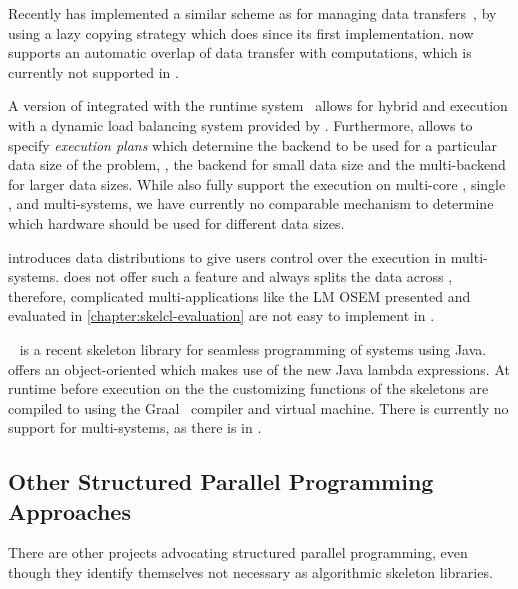Recently \SkePU has implemented a similar scheme as \SkelCL for managing data transfers~\cite{DastgeerKe14}, by using a lazy copying strategy which \SkelCL does since its first implementation.
\SkePU now supports an automatic overlap of data transfer with computations, which is currently not supported in \SkelCL.

A version of \SkePU integrated with the \StarPU runtime system~\cite{AugonnetTNW09} allows for hybrid \CPU and \GPU execution with a dynamic load balancing system provided by \StarPU.
Furthermore, \SkePU allows to specify \emph{execution plans} which determine the backend to be used for a particular data size of the problem, \eg, the \OpenMP backend for small data size and the \CUDA multi-\GPU backend for larger data sizes.
While \SkelCL also fully support the execution on multi-core \CPUs, single \GPUs, and  multi-\GPU systems, we have currently no comparable mechanism to determine which hardware should be used for different data sizes.

\SkelCL introduces data distributions to give users control over the execution in multi-\GPU systems.
\SkePU does not offer such a feature and always splits the data across \GPUs, therefore, complicated multi-\GPU applications like the LM OSEM presented and evaluated in \autoref{chapter:skelcl-evaluation} are not easy to implement in \SkePU.

\bigskip

\emph{\JPAI}~\cite{FumeroStDu2014} is a recent skeleton library for seamless programming of \GPU systems using Java.
\JPAI offers an object-oriented \API which makes use of the new Java lambda expressions.
At runtime before execution on the \GPU the customizing functions of the skeletons are compiled to \OpenCL using the Graal~\cite{DuboscqStWuSiWiMo2013} compiler and virtual machine.
There is currently no support for multi-\GPU systems, as there is in \SkelCL.


\subsection[Other Structured Parallel Programming\\ Approaches]{Other Structured Parallel Programming Approaches}
There are other projects advocating structured parallel programming, even though they identify themselves not necessary as algorithmic skeleton libraries.

\bigskip

